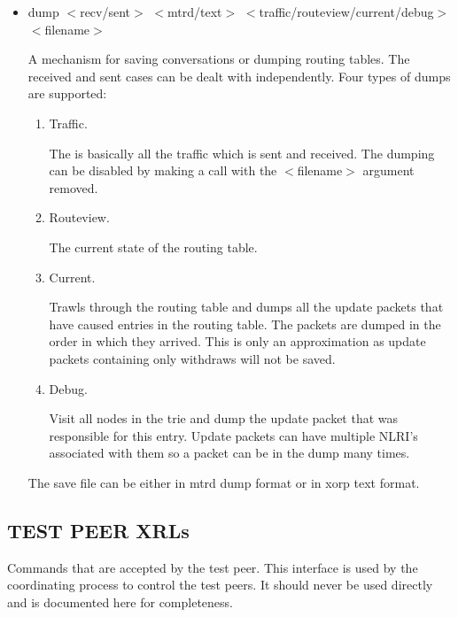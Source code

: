 \documentclass[11pt]{article}
\begin{document}
\begin{itemize}
\item {\sf dump $<$recv/sent$>$ $<$mtrd/text$>$ $<$traffic/routeview/current/debug$>$ $<$filename$>$}

  A mechanism for saving conversations or dumping routing tables. The
  received and sent cases can be dealt with independently. Four types
  of dumps are supported:

  \begin{enumerate}

        \item Traffic.

        The is basically all the traffic which is sent and
        received. The dumping can be disabled by making a call with
        the $<$filename$>$ argument removed.

        \item Routeview.

        The current state of the routing table.

        \item Current.

        Trawls through the routing table and dumps all the update
        packets that have caused entries in the routing table. The
        packets are dumped in the order in which they arrived. This is
        only an approximation as update packets containing only
        withdraws will not be saved.

        \item Debug.

        Visit all nodes in the trie and dump the update packet that
        was responsible for this entry. Update packets can have
        multiple NLRI's associated with them so a packet can be in the
        dump many times.

      \end{enumerate}

  The save file can be either in mtrd dump format or in xorp text format.

\end{itemize}
\subsection{TEST PEER XRLs}
Commands that are accepted by the test peer. This interface is
used by the coordinating process to control the test peers. It should
never be used directly and is documented here for completeness.
\end{document}
